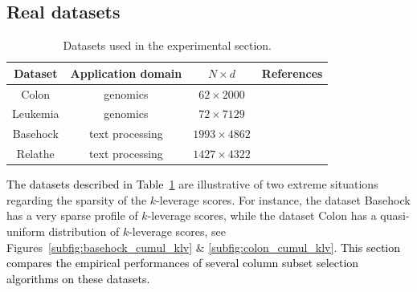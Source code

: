 \documentclass[twoside,11pt]{book}
\newcommand{\rev}[1]{\textcolor{black}{#1}}
\numberwithin{theorem}{chapter}
\numberwithin{definition}{chapter}
\numberwithin{proposition}{chapter}
\numberwithin{corollary}{chapter}
\numberwithin{example}{chapter}
\numberwithin{lemma}{chapter}
\numberwithin{assumption}{chapter}
\numberwithin{equation}{chapter}
\numberwithin{figure}{chapter}
\begin{document}


\subsection{Real datasets}
\label{s:realDatasets}

\begin{table}[h]
\centering
 \begin{tabular}{| c| c | c| c|}
 \hline
  Dataset & Application domain & $N \times d$  &  References\\
 \hline
 Colon & genomics & $62 \times 2000$  & \parencite{Al99}\\
 \hline
 Leukemia & genomics &$72 \times 7129$ & \parencite{Go99}\\
 \hline
 Basehock & text processing &$1993 \times 4862$ & \parencite{Li17} \\
 \hline
 Relathe & text processing & $1427 \times 4322$ & \parencite{Li17}\\
 \hline
\end{tabular}
\caption{Datasets used in the experimental section.
\label{table:real_datasets}}
\end{table}

\rev{The datasets described in Table~\ref{table:real_datasets}} are illustrative of two extreme situations regarding the sparsity of the $k$-leverage scores. For instance, the dataset Basehock has a very sparse profile of $k$-leverage scores, while the dataset Colon has a quasi-uniform distribution of $k$-leverage scores, see Figures~\ref{subfig:basehock_cumul_klv}  \& \ref{subfig:colon_cumul_klv}. \rev{This section compares the empirical performances of several column subset selection algorithms on these datasets.}
\end{document}
